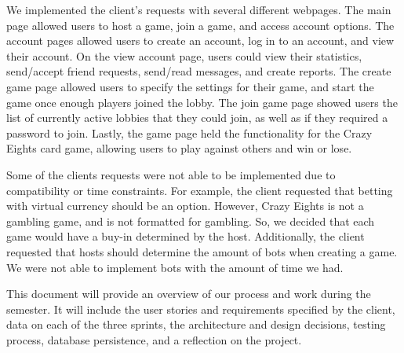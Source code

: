 We implemented the client's requests with several different webpages. The main page allowed users to host a game, join a game, and access account options. The account pages allowed users to create an account, log in to an account, and view their account. On the view account page, users could view their statistics, send/accept friend requests, send/read messages, and create reports. The create game page allowed users to specify the settings for their game, and start the game once enough players joined the lobby. The join game page showed users the list of currently active lobbies that they could join, as well as if they required a password to join. Lastly, the game page held the functionality for the Crazy Eights card game, allowing users to play against others and win or lose.

Some of the clients requests were not able to be implemented due to compatibility or time constraints. For example, the client requested that betting with virtual currency should be an option. However, Crazy Eights is not a gambling game, and is not formatted for gambling. So, we decided that each game would have a buy-in determined by the host. Additionally, the client requested that hosts should determine the amount of bots when creating a game. We were not able to implement bots with the amount of time we had.

This document will provide an overview of our process and work during the semester. It will include the user stories and requirements specified by the client, data on each of the three sprints, the architecture and design decisions, testing process, database persistence, and a reflection on the project.